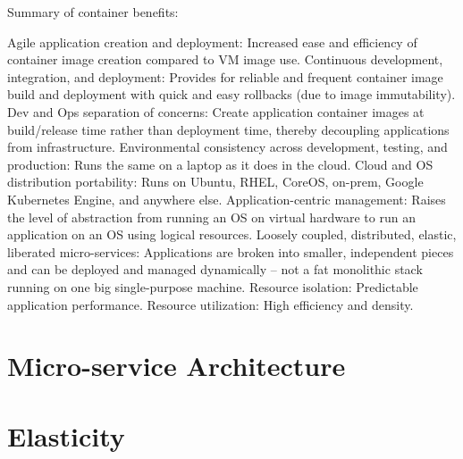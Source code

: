 Summary of container benefits:

Agile application creation and deployment: Increased ease and efficiency of container image creation compared to VM image use.
Continuous development, integration, and deployment: Provides for reliable and frequent container image build and deployment with quick and easy rollbacks (due to image immutability).
Dev and Ops separation of concerns: Create application container images at build/release time rather than deployment time, thereby decoupling applications from infrastructure.
Environmental consistency across development, testing, and production: Runs the same on a laptop as it does in the cloud.
Cloud and OS distribution portability: Runs on Ubuntu, RHEL, CoreOS, on-prem, Google Kubernetes Engine, and anywhere else.
Application-centric management: Raises the level of abstraction from running an OS on virtual hardware to run an application on an OS using logical resources.
Loosely coupled, distributed, elastic, liberated micro-services: Applications are broken into smaller, independent pieces and can be deployed and managed dynamically – not a fat monolithic stack running on one big single-purpose machine.
Resource isolation: Predictable application performance.
Resource utilization: High efficiency and density.


\section{Micro-service Architecture}
\label{sec:containers-orchestration-micro-service-architecture}



\section{Elasticity}
\label{sec:containers-orchestration-elasticity}

\lipsum[1]